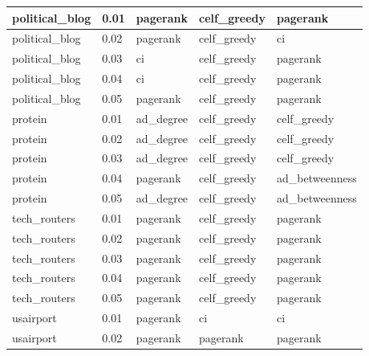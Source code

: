 \begin{longtable}[c]{|l|l|l|l|l|}
	political\_blog  & 0.01            & pagerank               & celf\_greedy           & pagerank            \\ \hline
	political\_blog  & 0.02            & pagerank               & celf\_greedy           & ci                  \\ \hline
	political\_blog  & 0.03            & ci                     & celf\_greedy           & pagerank            \\ \hline
	political\_blog  & 0.04            & ci                     & celf\_greedy           & pagerank            \\ \hline
	political\_blog  & 0.05            & pagerank               & celf\_greedy           & pagerank            \\ \hline
	protein          & 0.01            & ad\_degree             & celf\_greedy           & celf\_greedy        \\ \hline
	protein          & 0.02            & ad\_degree             & celf\_greedy           & celf\_greedy        \\ \hline
	protein          & 0.03            & ad\_degree             & celf\_greedy           & celf\_greedy        \\ \hline
	protein          & 0.04            & pagerank               & celf\_greedy           & ad\_betweenness     \\ \hline
	protein          & 0.05            & ad\_degree             & celf\_greedy           & ad\_betweenness     \\ \hline
	tech\_routers    & 0.01            & pagerank               & celf\_greedy           & pagerank            \\ \hline
	tech\_routers    & 0.02            & pagerank               & celf\_greedy           & pagerank            \\ \hline
	tech\_routers    & 0.03            & pagerank               & celf\_greedy           & pagerank            \\ \hline
	tech\_routers    & 0.04            & pagerank               & celf\_greedy           & pagerank            \\ \hline
	tech\_routers    & 0.05            & pagerank               & celf\_greedy           & pagerank            \\ \hline
	usairport        & 0.01            & pagerank               & ci                     & ci                  \\ \hline
	usairport        & 0.02            & pagerank               & pagerank               & pagerank            \\ \hline

\end{longtable}
